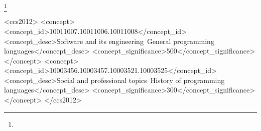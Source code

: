 \documentclass[sigplan,10pt,review,anonymous]{acmart}\settopmatter{printfolios=true,printccs=false,printacmref=false}
\begin{document}

\thanks{}                %


% 

\begin{CCSXML}
<ccs2012>
<concept>
<concept_id>10011007.10011006.10011008</concept_id>
<concept_desc>Software and its engineering~General programming languages</concept_desc>
<concept_significance>500</concept_significance>
</concept>
<concept>
<concept_id>10003456.10003457.10003521.10003525</concept_id>
<concept_desc>Social and professional topics~History of programming languages</concept_desc>
<concept_significance>300</concept_significance>
</concept>
</ccs2012>
\end{CCSXML}




\maketitle
\end{document}
